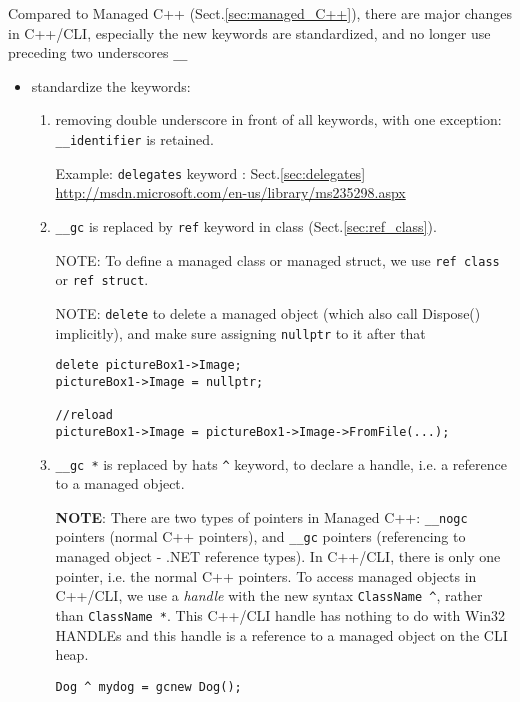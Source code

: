 Compared to Managed C++ (Sect.\ref{sec:managed_C++}), there are major changes in
C++/CLI, especially the new keywords are standardized, and no longer use
preceding two underscores \verb!__!

\begin{itemize}
  \item  standardize the keywords: 
  
  \begin{enumerate}
    \item removing double underscore in front of all keywords, with one
  exception: \verb!__identifier! is retained. 

Example: \verb!delegates! keyword : Sect.\ref{sec:delegates}  
\url{http://msdn.microsoft.com/en-us/library/ms235298.aspx}

     \item \verb!__gc! is replaced by \verb!ref! keyword in class (Sect.\ref{sec:ref_class}).

NOTE: To define a managed class or managed struct, we use \verb!ref class! or
  \verb!ref struct!.

NOTE: \verb!delete! to delete a managed object (which also call Dispose()
  implicitly), and make sure assigning \verb!nullptr! to it after that
\begin{verbatim}
delete pictureBox1->Image;
pictureBox1->Image = nullptr;

//reload
pictureBox1->Image = pictureBox1->Image->FromFile(...);
\end{verbatim}

     \item \verb!__gc *! is replaced by hats \verb!^! keyword, to declare
  a handle, i.e. a reference to a managed object. 

{\bf NOTE}: There are two types of pointers in Managed C++: \verb!__nogc!
pointers (normal C++ pointers), and \verb!__gc! pointers (referencing to managed
object - .NET reference types). In C++/CLI, there is only one pointer, i.e. the
normal C++ pointers. To access managed objects in C++/CLI, we use a {\it handle}
with the new syntax \verb!ClassName ^!, rather than \verb!ClassName *!.
This C++/CLI handle has nothing to do with Win32 HANDLEs and this handle is a
reference to a managed object on the CLI heap.

\begin{verbatim}
Dog ^ mydog = gcnew Dog();


\end{verbatim}
\end{enumerate}
\end{itemize}
